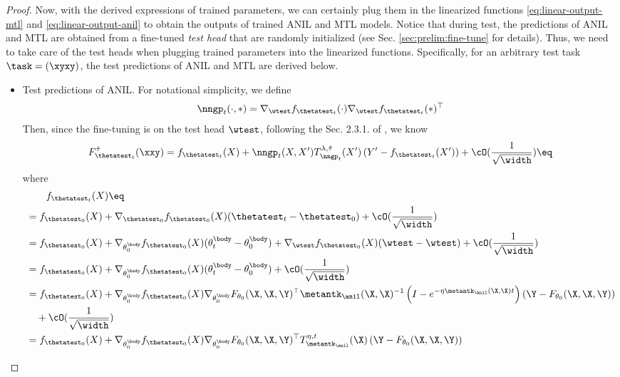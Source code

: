 \documentclass{article}
\begin{document}
\begin{proof}
Now, with the derived expressions of trained parameters, we can certainly plug them in the linearized functions \eqref{eq:linear-output-mtl} and \eqref{eq:linear-output-anil} to obtain the outputs of trained ANIL and MTL models. Notice that during test, the predictions of ANIL and MTL are obtained from a fine-tuned \textit{test head} that are randomly initialized (see Sec. \ref{sec:prelim:fine-tune} for details). Thus, we need to take care of the test heads when plugging trained parameters into the linearized functions. Specifically, for an arbitrary test task $\task = (\xyxy)$, the test predictions of ANIL and MTL are derived below.
\begin{itemize}
    \item Test predictions of ANIL.
    For notational simplicity, we define 
    $$\nngp_t(\cdot,\ast) = \nabla_{\wtest} f_{\thetatest_t}(\cdot) \nabla_{\wtest}  f_{\thetatest_t}(\ast)^\top$$
    Then, since the fine-tuning is on the test head $\wtest$, following the Sec. 2.3.1. of \citet{lee2019wide}, we know
    \begin{align*}
        F^{\hat\tau}_{\thetatest_t} (\xxy) = f_{\thetatest_t}(X) +  \nngp_t(X,X') T^{\lambda,\hat\tau}_{\nngp_t}(X')\left ( Y' -  f_{\thetatest_t}(X')\right) + \cO(\frac{1}{\sqrt{\width}})\eq
    \end{align*}
    where 
    \begin{align*}
        &\qquad f_{\thetatest_t}(X) \eq\\
        &= f_{\thetatest_0}(X) + \nabla_{\thetatest_0} f_{\thetatest_0}(X) (\thetatest_t - \thetatest_0) + \cO(\frac{1}{\sqrt{\width}})\\
        &=f_{\thetatest_0}(X) +\nabla_{\theta_0^\body} f_{\thetatest_0}(X) (\theta^\body_t - \theta_0^\body) + \nabla_{\wtest} f_{\thetatest_0}(X) (\wtest - \wtest)+ \cO(\frac{1}{\sqrt{\width}}) \\
        &=f_{\thetatest_0}(X) +\nabla_{\theta_0^\body} f_{\thetatest_0}(X) (\theta^\body_t - \theta_0^\body) + \cO(\frac{1}{\sqrt{\width}})\\
        &=f_{\thetatest_0}(X) +\nabla_{\theta_0^\body} f_{\thetatest_0}(X)  \nabla_{\theta_0^\body} F_{\theta_0}(\X,\X,\Y)^\top \metantk_\anil(\X,\X)^{-1} \left(I - e^{-\eta \metantk_\anil(\X,\X)t }\right)  \left(\Y - F_{\theta_0}(\X,\X,\Y)\right)\\
        &\quad + \cO(\frac{1}{\sqrt{\width}}) \\
        &=f_{\thetatest_0}(X) +\nabla_{\theta_0^\body} f_{\thetatest_0}(X)  \nabla_{\theta_0^\body} F_{\theta_0}(\X,\X,\Y)^\top T^{\eta,t}_{\metantk_\anil}(\X) \left(\Y - F_{\theta_0}(\X,\X,\Y)\right)

\end{align*}
\end{itemize}
\end{proof}
\end{document}
